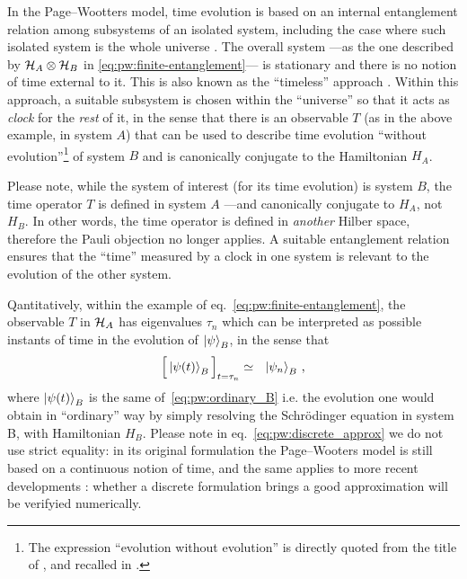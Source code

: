 In the Page--Wootters model, time evolution is based on an internal entanglement
relation among subsystems of an isolated system,
including the case where such isolated system is the whole universe \parencite{PageWootters}.
The overall system
---as the one described by $\mathcal{H}_A \otimes \mathcal{H}_B$ in \eqref{eq:pw:finite-entanglement}---
is stationary and there is no notion
of time external to it.
This is also known as the
``timeless'' approach \parencite{Marletto:Evolution}.
\citereset
Within this approach,
a suitable subsystem is chosen within the ``universe'' so that it acts as
\emph{clock} for the \emph{rest} of it, in the sense that
there is an observable $T$ (as in the above example, in system $A$)
that can be used to
describe time evolution ``without evolution''\footnote{
  The expression ``evolution without evolution''
  is directly quoted from the title of \cite{PageWootters},
  and recalled in \cite{Marletto:Evolution}.
}
of system $B$
and is canonically conjugate to the Hamiltonian $H_A$.

Please note, while the system of interest (for its time evolution) is system $B$,
the time operator $T$ is defined in system $A$ ---and canonically conjugate to $H_A$, not $H_B$.
In other words, the time operator is defined in \emph{another} Hilber space, therefore
the Pauli objection no longer applies. A suitable entanglement relation ensures that 
the ``time'' measured by a clock in one system is relevant to the evolution of the other system.

Qantitatively, within the example of eq.~\eqref{eq:pw:finite-entanglement},
the observable $T$ in $\mathcal{H}_A$
has eigenvalues $\tau_n$ which can be interpreted as possible
instants of time in the evolution of $\ket{\psi}_B$, in the sense that
\begin{equation}\label{eq:pw:discrete_approx}
  \Big[ \ket{\psi(t)}_B \Big]_{t=\tau_n} \simeq \,\,\,\, \ket{\psi_n}_B \, \text{,}
\end{equation}
where $\ket{\psi(t)}_B$ is the same of~\eqref{eq:pw:ordinary_B} i.e.
the evolution one would obtain in ``ordinary'' way
by simply resolving the Schr\"{o}dinger equation in system B, with Hamiltonian $H_B$.
Please note in eq.~\eqref{eq:pw:discrete_approx} we do not use strict equality:
in its original formulation the Page--Wooters model is still based on a continuous
notion of time, and the same applies to more recent developments \parencite{Lloyd:Time}:
whether a discrete formulation
brings a good approximation
will be verifyied numerically.

